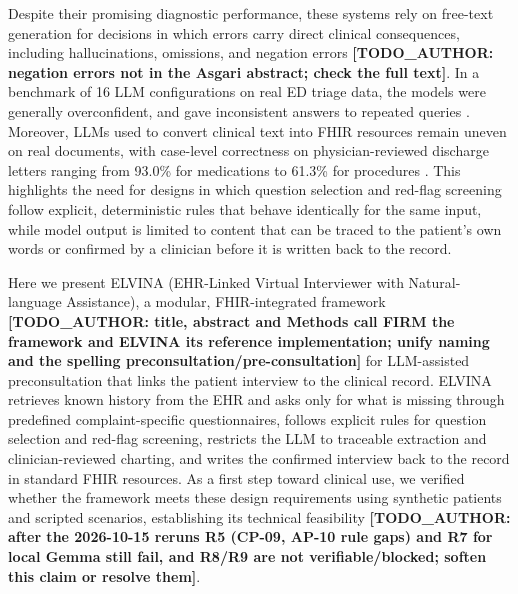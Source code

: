 \documentclass[lineno,pdflatex,sn-basic]{sn-jnl}%
\theoremstyle{thmstyleone}%
\theoremstyle{thmstyletwo}%
\theoremstyle{thmstylethree}%
\begin{document}
Despite their promising diagnostic performance, these systems rely on free-text generation for decisions in which errors carry direct clinical consequences, including hallucinations, omissions, and negation errors \citep{asgariFrameworkAssessClinical2025} \textbf{[TODO\_AUTHOR: negation errors not in the Asgari abstract; check the full text]}. In a benchmark of 16 LLM configurations on real ED triage data, the models were generally overconfident, and gave inconsistent answers to repeated queries \citep{benningPerformanceEvaluationBenchmarking2026}. Moreover, LLMs used to convert clinical text into FHIR resources \citep{liyikuanFHIRGPTEnhancesHealth2024} remain uneven on real documents, with case-level correctness on physician-reviewed discharge letters ranging from 93.0\% for medications to 61.3\% for procedures \citep{eryilmazExtractingMedicalInformation2026}. This highlights the need for designs in which question selection and red-flag screening follow explicit, deterministic rules that behave identically for the same input, while model output is limited to content that can be traced to the patient's own words or confirmed by a clinician before it is written back to the record.

Here we present ELVINA (EHR-Linked Virtual Interviewer with Natural-language Assistance), a modular, FHIR-integrated framework \textbf{[TODO\_AUTHOR: title, abstract and Methods call FIRM the framework and ELVINA its reference implementation; unify naming and the spelling preconsultation/pre-consultation]} for LLM-assisted preconsultation that links the patient interview to the clinical record. ELVINA retrieves known history from the EHR and asks only for what is missing through predefined complaint-specific questionnaires, follows explicit rules for question selection and red-flag screening, restricts the LLM to traceable extraction and clinician-reviewed charting, and writes the confirmed interview back to the record in standard FHIR resources. As a first step toward clinical use, we verified whether the framework meets these design requirements using synthetic patients and scripted scenarios, establishing its technical feasibility \textbf{[TODO\_AUTHOR: after the 2026-10-15 reruns R5 (CP-09, AP-10 rule gaps) and R7 for local Gemma still fail, and R8/R9 are not verifiable/blocked; soften this claim or resolve them]}.



\end{document}
